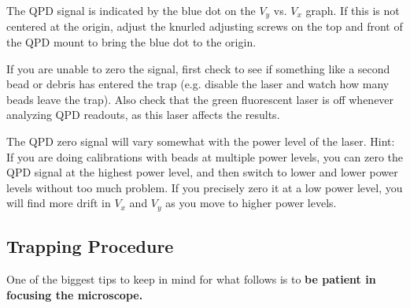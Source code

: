 \documentclass{../lab}
\begin{document}
The QPD signal is indicated by the blue dot on the $V_y$ vs. $V_x$ graph. If this is not centered at the origin, adjust the knurled adjusting screws on the top and front of the QPD mount to bring the blue dot to the origin.

If you are unable to zero the signal, first check to see if something like a second bead or debris has entered the trap (e.g. disable the laser and watch how many beads leave the trap). Also check that the green fluorescent laser is off whenever analyzing QPD readouts, as this laser affects the results.

The QPD zero signal will vary somewhat with the power level of the laser. Hint: If you are doing calibrations with beads at multiple power levels, you can zero the QPD signal at the highest power level, and then switch to lower and lower power levels without too much problem. If you precisely zero it at a low power level, you will find more drift in $V_x$ and $V_y$ as you move to higher power levels.

\subsection{Trapping Procedure}

One of the biggest tips to keep in mind for what follows is to \textbf{be patient in focusing the microscope.}
\end{document}
